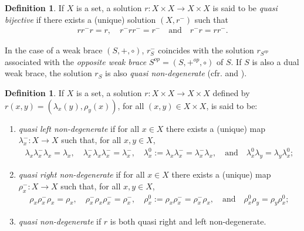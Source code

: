 \documentclass[preprint,1p]{elsarticle}
\theoremstyle{definition}               %
\newtheorem{defin}[theor]{Definition}
\begin{document}
\begin{defin}\label{defn-quasi}
      If $X$ is a set, a solution $r:X \times X  \to X \times X$ is said to be \emph{quasi bijective} if there exists a (unique) solution $\left(X, r^{-}\right)$ such that
      \begin{align*}
          rr^-r=r, \quad r^-rr^-=r^- \quad \text{and} \quad r^{-}r=rr^{-}.
      \end{align*}
\end{defin}

In the case of a weak brace $(S, +, \circ)$, $r_S^-$ coincides with the solution $r_{S^{op}}$ associated with the \emph{opposite weak brace} $S^{op}=\left(S, +^{op}, \circ\right)$ of $S$. If $S$ is also a dual weak brace, the solution $r_S$ is also \emph{quasi non-degenerate} (cfr. \cite[Definition 3.3]{MaSteWi26x} and \cite[Proposition 2.3]{MaSteWi26x}).

\begin{defin}\label{defn-left-right-quasi}
If $X$ is a set, a solution $r:X \times X  \to X \times X$ defined by $r(x,y)=(\lambda_x(y), \rho_y(x))$, for all $(x, y) \in X \times X$, is said to be:
    \begin{enumerate}
        \item[1)] \emph{quasi left non-degenerate} if for all $x \in X$ there exists a (unique) map $\lambda_x^{-}: X \to X$ such that, for all $x,y \in X$,
   \begin{align*}
       \lambda_x\lambda_x^{-}\lambda_x=\lambda_x, \quad \lambda_x^-\lambda_x\lambda_x^-=\lambda_x^-, \quad \lambda_x^0:=\lambda_x\lambda_x^{-}=\lambda_x^-\lambda_x, \quad\text{and}\quad \lambda_x^0\lambda_y=\lambda_y\lambda_x^0;
    \end{align*}
    \item[2)] \emph{quasi right non-degenerate} if for all $x \in X$
    there exists a (unique) map $\rho_x^{-}: X \to X$ such that, for all $x,y \in X$,
    \begin{align*}
       \rho_x\rho_x^{-}\rho_x=\rho_x, \quad \rho_x^-\rho_x\rho_x^-=\rho_x^-, \quad  \rho_x^0:=\rho_x\rho_x^{-}=\rho_x^-\rho_x, \quad\text{and}\quad \rho_x^0\rho_y=\rho_y\rho_x^0;
    \end{align*}
    \item[3)] \emph{quasi non-degenerate} if $r$ is both quasi right and left non-degenerate.
    \end{enumerate}
\end{defin}

\smallskip
\end{document}
